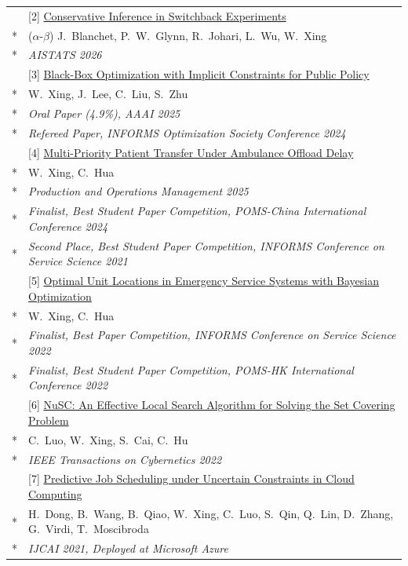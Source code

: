 \documentclass[letterpaper, 10pt]{article}
\newlength{\entrysep}   \setlength{\entrysep}{5pt}
\begin{document}
\begin{longtable}{p{}p{5.8in}}
& [2] \href{https://openreview.net/forum?id=psLjdDj7j1}{Conservative Inference in Switchback Experiments} \\*
& ($\alpha$-$\beta$) J.~Blanchet, P.~W.~Glynn, R.~Johari, L.~Wu, W.~Xing \\*
& \textit{AISTATS 2026} \\[\entrysep]

& [3] \href{https://doi.org/10.1609/aaai.v39i27.35074}{Black-Box Optimization with Implicit Constraints for Public Policy} \\*
& W.~Xing, J.~Lee, C.~Liu, S.~Zhu \\*
& \textit{Oral Paper (4.9\%), AAAI 2025} \\*
& \textit{Refereed Paper, INFORMS Optimization Society Conference 2024} \\[\entrysep]

& [4] \href{https://journals.sagepub.com/doi/10.1177/10591478251369598}{Multi-Priority Patient Transfer Under Ambulance Offload Delay} \\*
& W.~Xing, C.~Hua \\*
& \textit{Production and Operations Management 2025} \\*
& \textit{Finalist, Best Student Paper Competition, POMS-China International Conference 2024} \\*
& \textit{Second Place, Best Student Paper Competition, INFORMS Conference on Service Science 2021} \\[\entrysep]

& [5] \href{https://link.springer.com/chapter/10.1007/978-3-031-15644-1_32}{Optimal Unit Locations in Emergency Service Systems with Bayesian Optimization} \\*
& W.~Xing, C.~Hua \\*
& \textit{Finalist, Best Paper Competition, INFORMS Conference on Service Science 2022} \\*
& \textit{Finalist, Best Student Paper Competition, POMS-HK International Conference 2022} \\[\entrysep]

& [6] \href{https://ieeexplore.ieee.org/document/9877844}{NuSC: An Effective Local Search Algorithm for Solving the Set Covering Problem} \\*
& C.~Luo, W.~Xing, S.~Cai, C.~Hu \\*
& \textit{IEEE Transactions on Cybernetics 2022} \\[\entrysep]

& [7] \href{https://www.ijcai.org/proceedings/2021/499}{Predictive Job Scheduling under Uncertain Constraints in Cloud Computing} \\*
& H.~Dong, B.~Wang, B.~Qiao, W.~Xing, C.~Luo, S.~Qin, Q.~Lin, D.~Zhang, G.~Virdi, T.~Moscibroda \\*
& \textit{IJCAI 2021, Deployed at Microsoft Azure} \\[\entrysep]


\end{longtable}
\end{document}
